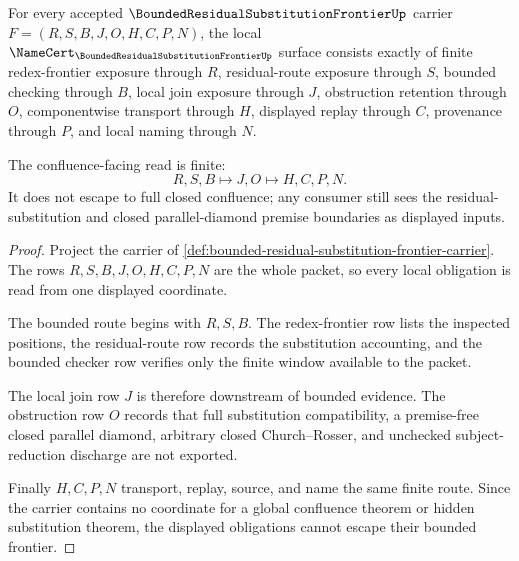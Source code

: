 \begin{theorem}
\label{thm:bounded-residual-substitution-frontier-obligations}
For every accepted $\BoundedResidualSubstitutionFrontierUp$ carrier $F=(R,S,B,J,O,H,C,P,N)$, the local $\NameCert_{\BoundedResidualSubstitutionFrontierUp}$ surface consists exactly of finite redex-frontier exposure through $R$, residual-route exposure through $S$, bounded checking through $B$, local join exposure through $J$, obstruction retention through $O$, componentwise transport through $H$, displayed replay through $C$, provenance through $P$, and local naming through $N$.

The confluence-facing read is finite:
$$
R,S,B \longmapsto J,O \longmapsto H,C,P,N .
$$
It does not escape to full closed confluence; any consumer still sees the residual-substitution and closed parallel-diamond premise boundaries as displayed inputs.
\end{theorem}
\begin{proof}
Project the carrier of \autoref{def:bounded-residual-substitution-frontier-carrier}. The rows $R,S,B,J,O,H,C,P,N$ are the whole packet, so every local obligation is read from one displayed coordinate.

The bounded route begins with $R,S,B$. The redex-frontier row lists the inspected positions, the residual-route row records the substitution accounting, and the bounded checker row verifies only the finite window available to the packet.

The local join row $J$ is therefore downstream of bounded evidence. The obstruction row $O$ records that full substitution compatibility, a premise-free closed parallel diamond, arbitrary closed Church--Rosser, and unchecked subject-reduction discharge are not exported.

Finally $H,C,P,N$ transport, replay, source, and name the same finite route. Since the carrier contains no coordinate for a global confluence theorem or hidden substitution theorem, the displayed obligations cannot escape their bounded frontier.
\end{proof}


